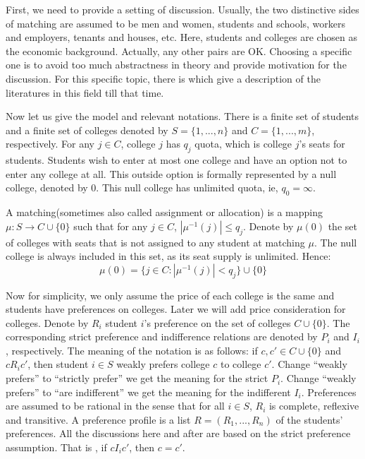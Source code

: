 First, we need to provide a setting of discussion. Usually, the two
distinctive sides of matching are assumed to be men and women,
students and schools, workers and employers, tenants and houses,
etc. Here, students and colleges are chosen as the economic
background. Actually, any other pairs are OK. Choosing a specific one
is to avoid too much abstractness in theory and provide motivation for
the discussion.  For this specific topic, there
is \parencite{Sonmez2003}  which give a description of the literatures
in this field
till that time. 

Now let us give the model and relevant notations. There is a finite set of students and a finite set of colleges denoted by  $S = \{1,...,n\}$ and $C = \{1,...,m\}$, respectively. For any $j \in C$, college $j$ has $q_j$ quota, which is college $j$'s seats for students. Students wish to enter at most one college and have an option not to enter any college at all. This outside option is formally represented by a null college, denoted by $0$. This null college has unlimited quota, ie, $q_0 = \infty$. 

A matching(sometimes also called assignment or allocation) is a
mapping $\mu : S \rightarrow C\cup\{0\}$ such that for any $j \in C$,
$|\mu^{-1}(j)| \leq q_j$. Denote by $\mu(0)$ the set of colleges with
seats that is not assigned to any student at matching $\mu$. The null
college is always included in this set, as its seat supply is
unlimited. Hence:
\[ \mu(0) = \{j \in C : |\mu^{-1}(j)| < q_j\}\cup \{0\}\]


 Now for simplicity, we only assume the price of each college is the same and students have preferences on colleges. Later we will add  price  consideration for colleges. Denote by $R_i$ student $i$'s preference on the set of colleges $C \cup \{0\}$. The corresponding strict preference and indifference relations are denoted by $P_i$ and $I_i$, respectively. The meaning of the notation is as follows: if $c,c'\in C \cup \{0\}$ and $c R_i c'$, then student $i \in S$ weakly prefers college $c$ to college $c'$. Change ``weakly prefers'' to ``strictly prefer'' we get the meaning for the strict $P_i$. Change ``weakly prefers'' to ``are indifferent'' we get the meaning for the indifferent $I_i$. Preferences are assumed to be rational in the sense that for all $i \in S$, $R_i$ is complete, reflexive and transitive. A preference profile is a list $ R = (R_1,...,R_n)$ of the students' preferences. All the discussions here and after are based on the strict preference assumption. That is , if $c I_i c'$, then $c=c'$.

